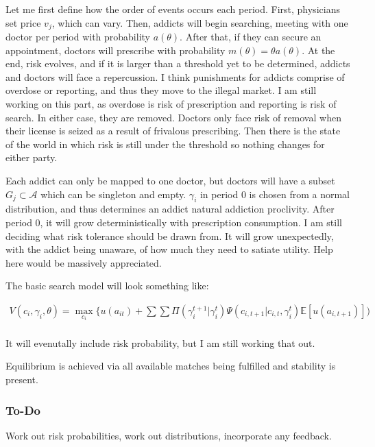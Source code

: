 \documentclass[11pt,a4paper]{article}
\begin{document}
Let me first define how the order of events occurs each period. First, physicians set price $v_j$, which can vary. Then, addicts will begin searching, meeting with one doctor per period with probability $a(\theta)$.
After that, if they can secure an appointment, doctors will prescribe with probability $m(\theta) = \theta a(\theta)$. At the end, risk evolves, and if it is larger than a threshold yet to be determined, addicts and 
doctors will face a repercussion. I think punishments for addicts comprise of overdose or reporting, and thus they move to the illegal market. I am still working on this part, as overdose is risk of prescription and reporting is risk of search.
In either case, they are removed. Doctors only face risk of removal when their license is seized as a result of frivalous prescribing. Then there is the state of the world in which risk is still under the threshold so nothing changes for either party. 

Each addict can only be mapped to one doctor, but doctors will have a subset $G_j \subset \mathcal{A}$ which can be singleton and empty. $\gamma_{i}$ in period 0 is chosen from a normal distribution, and thus determines an addict natural 
addiction proclivity. After period 0, it will grow deterministically with prescription consumption. I am still deciding what risk tolerance should be drawn from. It will grow unexpectedly, with the addict being unaware, of how much they need to satiate
utility. Help here would be massively appreciated. 

The basic search model will look something like:

\begin{gather*}
  V(c_i, \gamma_i, \theta) = \max_{c_i}\{u(a_{it}) + \sum\sum \Pi(\gamma^{t+1}_i|\gamma_i^t) \Psi(c_{i,t+1}|c_{i,t}, \gamma_i^t)  \mathbb{E}[u(a_{i,t+1})]) \\
\end{gather*}

It will evenutally include risk probability, but I am still working that out.

Equilibrium is achieved via all available matches being fulfilled and stability is present.

\subsubsection*{To-Do}
\label{subsubsec:todo}

Work out risk probabilities, work out distributions, incorporate any feedback.
\end{document}
